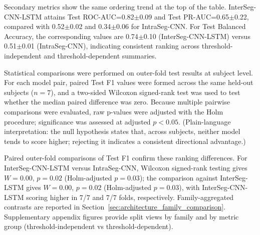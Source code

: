 Secondary metrics show the same ordering trend at the top of the table. InterSeg-CNN-LSTM attains Test ROC-AUC=0.82$\pm$0.09 and Test PR-AUC=0.65$\pm$0.22, compared with 0.52$\pm$0.02 and 0.34$\pm$0.06 for IntraSeg-CNN. For Test Balanced Accuracy, the corresponding values are 0.74$\pm$0.10 (InterSeg-CNN-LSTM) versus 0.51$\pm$0.01 (IntraSeg-CNN), indicating consistent ranking across threshold-independent and threshold-dependent summaries.

Statistical comparisons were performed on outer-fold test results at subject level. For each model pair, paired Test F1 values were formed across the same held-out subjects (\(n=7\)), and a two-sided Wilcoxon signed-rank test was used to test whether the median paired difference was zero. Because multiple pairwise comparisons were evaluated, raw p-values were adjusted with the Holm procedure; significance was assessed at adjusted \(p<0.05\).
(Plain-language interpretation: the null hypothesis states that, across subjects, neither model tends to score higher; rejecting it indicates a consistent directional advantage.)

Paired outer-fold comparisons of Test F1 confirm these ranking differences. For InterSeg-CNN-LSTM versus IntraSeg-CNN, Wilcoxon signed-rank testing gives $W=0.00$, $p=0.02$ (Holm-adjusted $p=0.03$); the comparison against InterSeg-LSTM gives $W=0.00$, $p=0.02$ (Holm-adjusted $p=0.03$), with InterSeg-CNN-LSTM scoring higher in 7/7 and 7/7 folds, respectively.
Family-aggregated contrasts are reported in Section~\ref{sec:architecture_family_comparison}. Supplementary appendix figures provide split views by family and by metric group (threshold-independent vs threshold-dependent).

